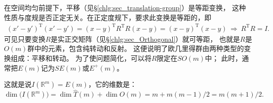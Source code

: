 在空间均匀前提下，平移（见\S\ref{chlg:sec_translation-group}）是等距变换，
这种性质与度规是否正定无关。在正定度规下，要求此变换是等距的，即
\begin{align*}
    (x'-y')^{\mathrm{T}} (x'-y') = ( x - y )^{\mathrm{T}} R^{\mathrm{T}}  R ( x - y )
    = (x-y)^{\mathrm{T}} (x-y) \ \Rightarrow\ R^{\mathrm{T}} R = I .
\end{align*}
可见只要变换$R$是实正交矩阵（见\S\ref{chlg:sec_Orthogonal}）就可等距，
也就是$R$是$O(m)$群中的元素，包含纯转动和反射。
这便说明了欧几里得群由两种类型的变换组成：平移和转动。
为了使问题简化，可以将$R$限定在$SO(m)$中；
此时，通常把$E(m)$记为$SE(m)$或$E^+ (m)$。

这就是说$I(\mathbb{R}^m)=E(m)$，它的维数是：
\begin{equation*}
    \dim \bigl(I(\mathbb{R}^m)\bigr)= \dim   \hat{T}(m) + \dim  O(m)
    = m + m(m-1)/2 = m(m+1)/2 .
\end{equation*}

